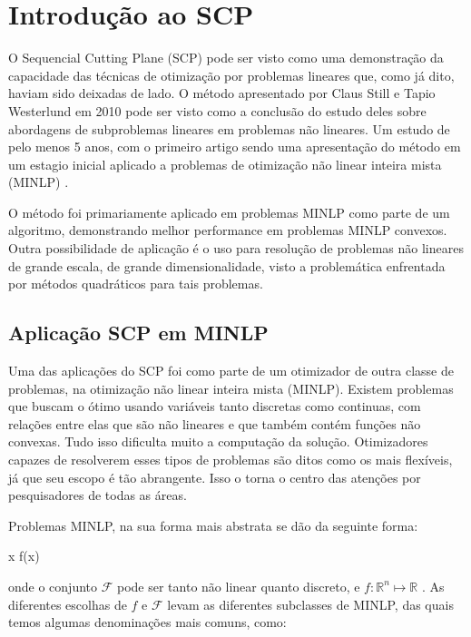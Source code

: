 \section{Introdução ao SCP}

\noindent
O Sequencial Cutting Plane (SCP) \cite{Still2010} pode ser visto como uma demonstração da
capacidade das técnicas de otimização por problemas lineares que, como já dito, haviam
sido deixadas de lado. O método apresentado por Claus Still e Tapio Westerlund em 2010
pode ser visto como a conclusão do estudo deles sobre abordagens de subproblemas lineares
em problemas não lineares. Um estudo de pelo menos 5 anos, com o primeiro artigo sendo
uma apresentação do método em um estagio inicial aplicado a problemas de otimização
não linear inteira mista (MINLP) \cite{Still_2005}.

O método foi primariamente aplicado em problemas MINLP como parte de um algoritmo,
demonstrando melhor performance em problemas MINLP convexos. Outra possibilidade de
aplicação é o uso para resolução de problemas não lineares de grande escala, de grande
dimensionalidade, visto a problemática enfrentada por métodos quadráticos para tais
problemas.

\subsection{Aplicação SCP em MINLP}

\noindent
Uma das aplicações do SCP foi como parte de um otimizador de outra classe de problemas, na
otimização não linear inteira mista (MINLP). Existem problemas que buscam o ótimo usando
variáveis tanto discretas como continuas, com relações entre elas que são não lineares e
que também contém funções não convexas. Tudo isso dificulta muito a computação da solução.
Otimizadores capazes de resolverem esses tipos de problemas são ditos como os mais flexíveis,
já que seu escopo é tão abrangente. Isso o torna o centro das atenções por pesquisadores de
todas as áreas.

Problemas MINLP, na sua forma mais abstrata se dão da seguinte forma:

\vspace{-15pt}
\begin{mini!}
{x}{ f(x) \label{minlp_obj}}{\label{prob_minlp}}{}
\end{mini!}
onde o conjunto \( \mathcal{F} \) pode ser tanto não linear quanto discreto, e \( f: \mathbb{R}^n \mapsto \mathbb{R}\) .
As diferentes escolhas
de \(f\) e \(\mathcal{F}\) levam as diferentes subclasses de MINLP, das quais temos algumas
denominações mais comuns, como:

